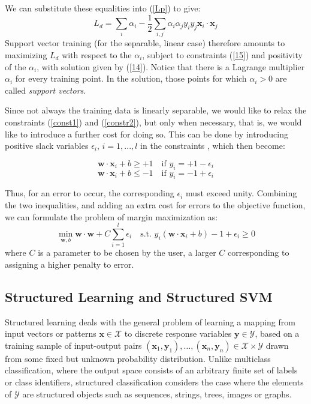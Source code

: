We can substitute these equalities into (\ref{Lp}) to give:
\begin{equation}
L_d=  \sum_{i} \alpha_i - \frac{1}{2} \sum_{i,j} \alpha_i\alpha_j y_iy_j \mathbf{x}_i \cdot \mathbf{x}_j
\end{equation}
Support vector training (for the separable, linear case) therefore amounts to maximizing
$L_d$ with respect to the $\alpha_i$, subject to constraints (\ref{15}) and positivity of the $\alpha_i$, with solution
given by (\ref{14}). Notice that there is a Lagrange multiplier $\alpha_i$ for every training point. In
the solution, those points for which $\alpha_i > 0$ are called \textit{support vectors}.

Since not always the training data is linearly separable, we would like to relax the constraints (\ref{const1}) and (\ref{constr2}), but only when necessary, that is, we would like to introduce a further cost for
doing so. This can be done by introducing positive slack variables $\epsilon_i$, $i = 1, ... , l$ in the
constraints \cite{cortes1995support}, which then become:

\begin{equation}
\mathbf{w} \cdot \mathbf{x}_i + b \ge +1 \quad \text{if } y_i = +1 - \epsilon_i
\label{const1b}
\end{equation}
\begin{equation}
\mathbf{w} \cdot \mathbf{x}_i + b \le -1 \quad \text{if } y_i = -1 + \epsilon_i
\label{constr2b}
\end{equation}

Thus, for an error to occur, the corresponding $\epsilon_i$ must exceed unity. Combining the two inequalities, and adding an extra cost for errors to the objective function, we can formulate the problem of margin maximization as:
\begin{equation}
\min_{\mathbf{w},b} \mathbf{w}\cdot\mathbf{w} + C \sum_{i=1}^l \epsilon_i \quad \text{s.t.  }
y_i(\mathbf{w} \cdot \mathbf{x}_i + b)-1 + \epsilon_i \ge 0
\label{ineq-constr}
\end{equation}
where $C$ is a parameter to be chosen by the user, a larger $C$ corresponding to assigning
a higher penalty to error.

\subsection{Structured Learning and Structured SVM}
Structured learning deals with the general problem of learning a mapping
from input vectors or patterns $\mathbf{x}\in\mathcal{X}$ to discrete
response variables $\mathbf{y}\in\mathcal{Y}$, based on a training
sample of input-output pairs $(\mathbf{x}_{1},\mathbf{y}_{1}),\ldots,(\mathbf{x}_{n},\mathbf{y}_{n})\in\mathcal{X}\times\mathcal{Y}$
drawn from some fixed but unknown probability distribution. Unlike
multiclass classification, where the output space consists of an arbitrary
finite set of labels or class identifiers, structured classification
considers the case where the elements of $\mathcal{Y}$ are structured
objects such as sequences, strings, trees, images or graphs. 

